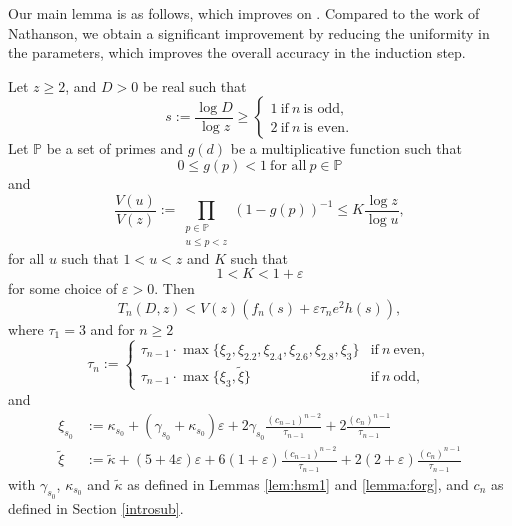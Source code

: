 \documentclass[12pt]{amsart}
\begin{document}
Our main lemma is as follows, which improves on \cite[Theorem 9.5]{Nathanson}. Compared to the work of Nathanson, we obtain a significant improvement by reducing the uniformity in the parameters, which improves the overall accuracy in the induction step.
\begin{lemma}
\label{lemma:expf_n}
Let $z\ge 2$, and $D > 0$ be real such that 
\begin{equation*} 
s:=\frac{\log D}{\log z}\ge 
\begin{cases} 
1 ~\text{if} ~ n  ~\text{is odd,} \\
2 ~\text{if}~n ~\text{is even} .
\end{cases} 
\end{equation*}
Let $\mathbb{P}$ be a set of primes and $g(d)$ be a multiplicative function such that
\begin{equation*}
0 \le g(p) < 1 ~\text{for all} ~p \in \mathbb{P}
\end{equation*} 
and
\begin{equation}
\label{eq:prod11}
\frac{V(u)}{V(z)}:=\prod_{\substack{p\in \mathbb{P}\\ u \le p < z}}(1-g(p))^{-1} \le K \frac{\log z}{\log u},
\end{equation}
for all $u$ such that $1 < u < z$ and $K$ such that
\begin{equation}
\label{eq:epsilonK}
1< K < 1+\varepsilon
\end{equation}
for some choice of $\varepsilon>0$. 
Then
\begin{equation*}
T_n(D,z)<V(z)\left( f_n(s)+\varepsilon\tau_n e^2h(s)\right),
\end{equation*}
where $\tau_1=3$ and for $n\ge 2$
\begin{equation} 
\label{eq:tau}
\tau_n:=
\begin{cases} 
    \tau_{n-1}\cdot \max\{\xi_2,\xi_{2.2},\xi_{2.4},\xi_{2.6},\xi_{2.8},\xi_3\} & \text{if}~n\ \text{even}, \\
    \tau_{n-1}\cdot\max\{\xi_3,\tilde{\xi}\} & \text{if}~n\ \text{odd},
\end{cases} 
\end{equation}
and
\begin{align*}
    \xi_{s_0}&:=\kappa_{s_0}+\left(\gamma_{s_0}+\kappa_{s_0}\right)\varepsilon+2\gamma_{s_0}\frac{(c_{n-1})^{n-2}}{\tau_{n-1}}+2\frac{(c_n)^{n-1}}{\tau_{n-1}}\\
    \tilde{\xi}&:=\tilde{\kappa}+(5+4\varepsilon)\varepsilon+6(1+\varepsilon)\frac{(c_{n-1})^{n-2}}{\tau_{n-1}}+2(2+\varepsilon)\frac{(c_n)^{n-1}}{\tau_{n-1}}
\end{align*}
with $\gamma_{s_0}$, $\kappa_{s_0}$ and $\tilde{\kappa}$ as defined in Lemmas \ref{lem:hsm1} and \ref{lemma:forg}, and $c_n$ as defined in Section \ref{introsub}. 
\end{lemma}
\end{document}
